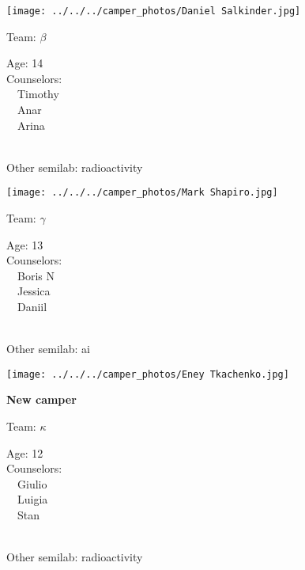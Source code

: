 \documentclass[10pt,letterpaper, landscape]{article}
\begin{document}
\horizontalshiftfornextsticker
\renewcommand{\baselinestretch}{1} \begin{sticker}
\noindent\begin{minipage}{0.5\textwidth}\texttt{[image: ../../../camper\_photos/Daniel Salkinder.jpg]}\end{minipage}\begin{minipage}{0.45\textwidth}
Team: {\Large $\beta$}

Age:        14\\
Counselors: \\\ \ Timothy\\\ \ Anar\\\ \ Arina\\
\end{minipage} \\ \vspace{0.07in}
Other semilab: radioactivity
\end{sticker}
\verticalshiftfornextsticker
\renewcommand{\baselinestretch}{1} \begin{sticker}
\noindent\begin{minipage}{0.5\textwidth}\texttt{[image: ../../../camper\_photos/Mark Shapiro.jpg]}\end{minipage}\begin{minipage}{0.45\textwidth}
Team: {\Large $\gamma$}

Age:        13\\
Counselors: \\\ \ Boris N\\\ \ Jessica\\\ \ Daniil\\
\end{minipage} \\ \vspace{0.07in}
Other semilab: ai
\end{sticker}
\horizontalshiftfornextsticker
\renewcommand{\baselinestretch}{1} \begin{sticker}
\noindent\begin{minipage}{0.5\textwidth}\texttt{[image: ../../../camper\_photos/Eney Tkachenko.jpg]}\end{minipage}\begin{minipage}{0.45\textwidth}
\textbf{New camper} 

Team: {\Large $\kappa$}

Age:        12\\
Counselors: \\\ \ Giulio\\\ \ Luigia\\\ \ Stan\\
\end{minipage} \\ \vspace{0.07in}
Other semilab: radioactivity
\end{sticker}
\end{document}
